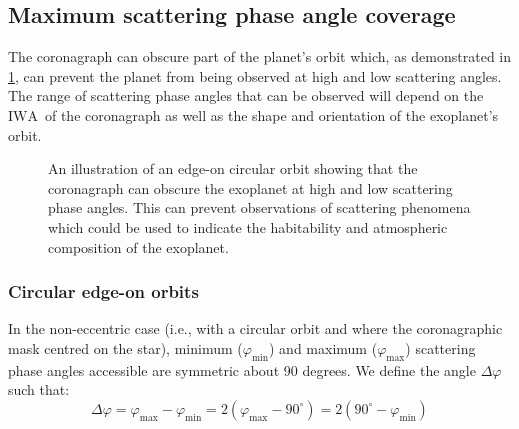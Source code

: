 \documentclass[
    usenatbib,
]{mnras}
\newcommand{\timmy}[1]{\textcolor{red}{[\textbf{Timmy:} #1]}} %
\newcommand{\IWA}{\ensuremath{\mathrm{IWA}}}
\begin{document}

\subsection{Maximum scattering phase angle coverage}
\label{sec:Delta_phi}

The coronagraph can obscure part of the planet's orbit which, as demonstrated in \cref{fig:annotated-orbit}, can prevent the planet from being observed at high and low scattering angles. 
%
The range of scattering phase angles that can be observed will depend on the \IWA\ of the coronagraph as well as the shape and orientation of the exoplanet's orbit.

\begin{figure}
    \centering
    
    \caption{
        An illustration of an edge-on circular orbit showing that the coronagraph can obscure the exoplanet at high and low scattering phase angles. This can prevent observations of scattering phenomena which could be used to indicate the habitability and atmospheric composition of the exoplanet. 
    }
    \label{fig:annotated-orbit}
\end{figure}


\subsubsection{Circular edge-on orbits}


In the non-eccentric case (i.e., with a circular orbit and where the coronagraphic mask centred on the star), minimum ($\varphi_\mathrm{min}$) and maximum ($\varphi_\mathrm{max}$) scattering phase angles accessible are symmetric about 90 degrees. 
%
We define the angle $\Delta \varphi$ such that: 
\begin{equation}
 \label{eq:Delta_phi}
    \Delta \varphi 
    = \varphi_\mathrm{max} - \varphi_\mathrm{min}
    =  2(\varphi_\mathrm{max} - 90^\circ) 
    =  2(90^\circ-\varphi_\mathrm{min} ) 
\end{equation}
\end{document}
